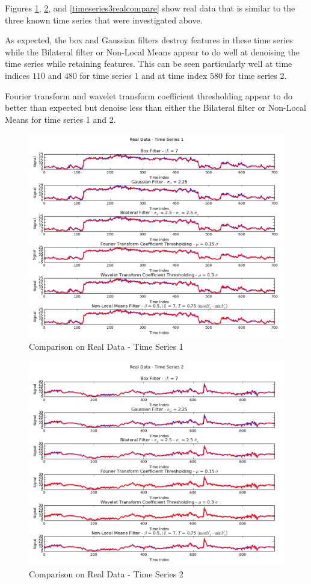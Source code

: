 \documentclass[11pt]{article}
\theoremstyle{definition}
\begin{document}
Figures \ref{timeseries1realcompare}, \ref{timeseries2realcompare}, and \ref{timeseries3realcompare} show real data that is similar to the three known time series that were investigated above.

As expected, the box and Gaussian filters destroy features in these time series while the Bilateral filter or Non-Local Means appear to do well at denoising the time series while retaining features. This can be seen particularly well at time indices $110$ and $480$ for time series 1 and at time index $580$ for time series 2.

Fourier transform and wavelet transform coefficient thresholding appear to do better than expected but denoise less than either the Bilateral filter or Non-Local Means for time series 1 and 2.

\begin{figure}[h!]
\centering
\includegraphics[width = 0.95 \textwidth]{TimeSeries1RealCompare.png}
\caption{Comparison on Real Data - Time Series 1}
\label{timeseries1realcompare}
\end{figure}

\begin{figure}[h!]
\centering
\includegraphics[width = 0.95 \textwidth]{TimeSeries2RealCompare.png}
\caption{Comparison on Real Data - Time Series 2}
\label{timeseries2realcompare}
\end{figure}
\end{document}
